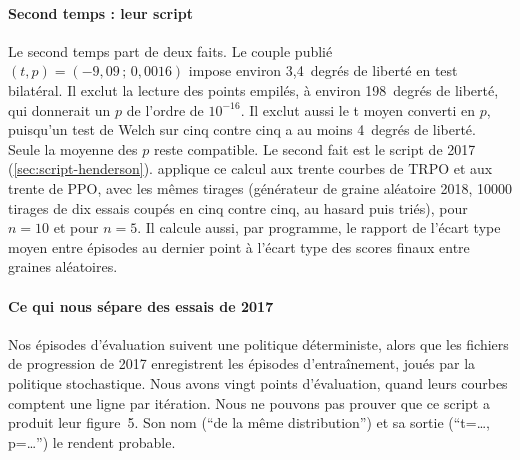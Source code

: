 \paragraph{Second temps : leur script}
Le second temps part de deux faits. Le couple publié $(t,p)=(-9{,}09\,;\,0{,}0016)$ impose environ 3,4~degrés de
liberté en test bilatéral. Il exclut la lecture des points empilés, à environ 198~degrés de liberté, qui
donnerait un $p$ de l'ordre de $10^{-16}$. Il exclut aussi le t moyen converti en $p$, puisqu'un test de Welch
sur cinq contre cinq a au moins 4~degrés de liberté. Seule la moyenne des $p$ reste compatible. Le second fait
est le script de 2017 (\cref{sec:script-henderson}).  applique ce calcul aux
trente courbes de TRPO et aux trente de PPO, avec les mêmes tirages (générateur de graine aléatoire 2018, \num{10000}
tirages de dix essais coupés en cinq contre cinq, au hasard puis triés), pour $n=10$ et pour $n=5$. Il calcule
aussi, par programme, le rapport de l'écart type moyen entre épisodes au dernier point à l'écart type des
scores finaux entre graines aléatoires.

\paragraph{Ce qui nous sépare des essais de 2017}
Nos épisodes d'évaluation suivent une politique déterministe, alors que les fichiers de progression de 2017
enregistrent les épisodes d'entraînement, joués par la politique stochastique. Nous avons vingt points
d'évaluation, quand leurs courbes comptent une ligne par itération. Nous ne pouvons pas prouver que ce script a produit leur
figure~5. Son nom (\enquote{de la même distribution}) et sa sortie (\enquote{t=\dots, p=\dots}) le rendent
probable.

